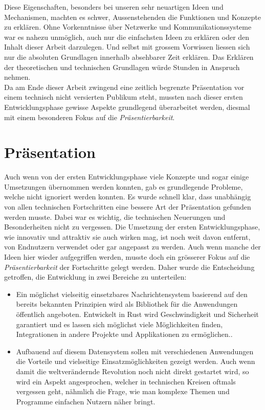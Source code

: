 \documentclass[a4paper,11pt,titlepage,twoside]{memoir}
\begin{document}
\noindent Diese Eigenschaften, besonders bei unseren sehr neuartigen
Ideen und Mechanismen, machten es schwer, Aussenstehenden die
Funktionen und Konzepte zu erklären. Ohne Vorkenntnisse über Netzwerke
und Kommunikationssysteme war es nahezu unmöglich, auch nur die
einfachsten Ideen zu erklären oder den Inhalt dieser Arbeit
darzulegen. Und selbst mit grossem Vorwissen liessen sich nur die
absoluten Grundlagen innerhalb absehbarer Zeit erklären. Das Erklären
der theoretischen und technischen Grundlagen würde Stunden in Anspruch
nehmen.\\

\noindent Da am Ende dieser Arbeit zwingend eine zeitlich begrenzte
Präsentation vor einem technisch nicht versierten Publikum steht,
mussten nach dieser ersten Entwicklungsphase gewisse Aspekte
grundlegend überarbeitet werden, diesmal mit einem besonderen Fokus
auf die \emph{Präsentierbarkeit}.
\section{Präsentation}
\label{sec:org8e6bb82}
Auch wenn von der ersten Entwicklungsphase viele Konzepte und sogar
einige Umsetzungen übernommen werden konnten, gab es grundlegende
Probleme, welche nicht ignoriert werden konnten. Es wurde schnell
klar, dass unabhängig von allen technischen Fortschritten eine bessere
Art der Präsentation gefunden werden musste. Dabei war es wichtig, die
technischen Neuerungen und Besonderheiten nicht zu vergessen. Die
Umsetzung der ersten Entwicklungsphase, wie innovativ und attraktiv
sie auch wirken mag, ist noch weit davon entfernt, von Endnutzern
verwendet oder gar angepasst zu werden. Auch wenn manche der Ideen
hier wieder aufgegriffen werden, musste doch ein grösserer Fokus auf
die \emph{Präsentierbarkeit} der Fortschritte gelegt werden. Daher wurde die
Entscheidung getroffen, die Entwicklung in zwei Bereiche zu
unterteilen:
\begin{itemize}
\item Ein möglichst vielseitig einsetzbares Nachrichtensystem basierend
auf den bereits bekannten Prinzipien wird als Bibliothek für die
Anwendungen öffentlich angeboten. Entwickelt in Rust wird
Geschwindigkeit und Sicherheit garantiert und es lassen sich
möglichst viele Möglichkeiten finden, Integrationen in andere
Projekte und Applikationen zu ermöglichen..
\item Aufbauend auf diesem Datensystem sollen mit verschiedenen
Anwendungen die Vorteile und vielseitige Einsatzmöglichkeiten
gezeigt werden. Auch wenn damit die weltverändernde Revolution noch
nicht direkt gestartet wird, so wird ein Aspekt angesprochen,
welcher in technischen Kreisen oftmals vergessen geht, nähmlich die
Frage, wie man komplexe Themen und Programme einfachen Nutzern näher
bringt.
\end{itemize}
\end{document}
